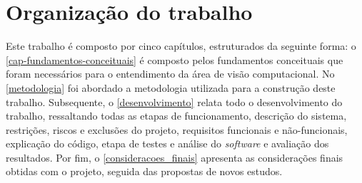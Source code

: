 \section{\textbf{Organização do trabalho}}

Este trabalho é composto por cinco capítulos, estruturados da seguinte forma: o \autoref{cap-fundamentos-conceituais} é composto pelos fundamentos conceituais que foram necessários para o entendimento da área de visão computacional. No \autoref{metodologia} foi abordado a metodologia utilizada para a construção deste trabalho.  Subsequente, o \autoref{desenvolvimento} relata todo o desenvolvimento do trabalho, ressaltando todas as etapas de funcionamento, descrição do sistema,  restrições, riscos e exclusões do projeto, requisitos funcionais e não-funcionais, explicação do código, etapa de testes e análise do \textit{software} e avaliação dos resultados. Por fim, o \autoref{consideracoes_finais} apresenta as considerações finais obtidas com o projeto, seguida das propostas de novos estudos.